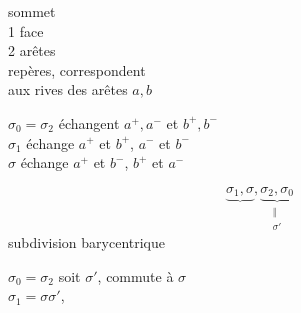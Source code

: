  sommet\\
1 face\\
2 arêtes\\
 repères, correspondent\\
aux rives des arêtes $a,b$


$\sigma_0=\sigma_2$ échangent $a^+,a^-$ et $b^+,b^-$\\
$\sigma_1$ échange  $a^+$ et $b^+$, $a^-$ et $b^-$\\
$\sigma$ échange $a^+$ et $b^-$, $b^+$ et $a^-$

\[\underbrace{\sigma_1,\sigma},\underbrace{\sigma_2,\sigma_0}_{\substack{\Vert\\\sigma'}}\]
subdivision barycentrique

$\sigma_0=\sigma_2$ soit $\sigma'$, commute à $\sigma$\\
$\sigma_1=\sigma\sigma'$,\\

